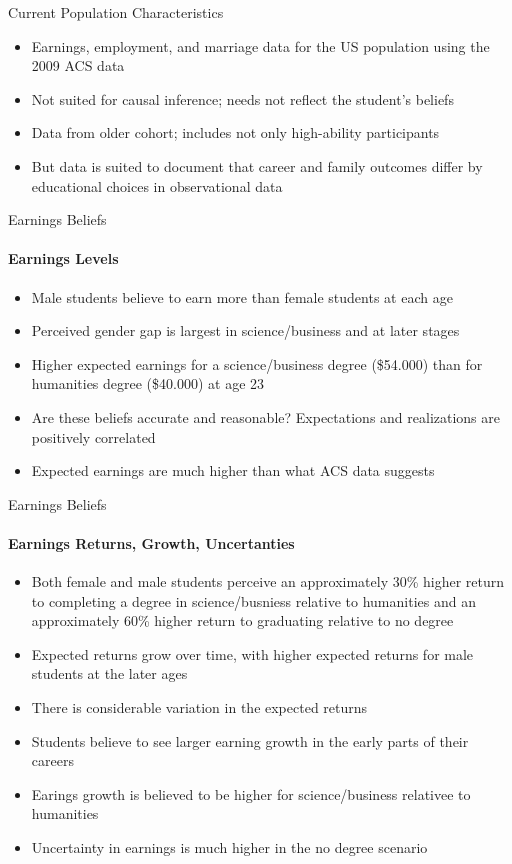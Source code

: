 \documentclass[12pt]{beamer}
\begin{document}
\begin{frame}{Current Population Characteristics}
    \begin{itemize}
        \item Earnings, employment, and marriage data for the US population using the 2009 ACS data
        \item Not suited for causal inference; needs not reflect the student's beliefs
        \item Data from older cohort; includes not only high-ability participants
        \item But data is suited to document that career and family outcomes differ by educational choices in observational data
    \end{itemize}
\end{frame}

\begin{frame}{Earnings Beliefs}
    \framesubtitle{Earnings Levels} 
    \begin{itemize}
        \item Male students believe to earn more than female students at each age
        \item Perceived gender gap is largest in science/business and at later stages
        \item Higher expected earnings for a science/business degree (\$54.000) than for humanities degree (\$40.000) at age 23
        \item Are these beliefs accurate and reasonable? Expectations and realizations are positively correlated
        \item Expected earnings are much higher than what ACS data suggests
    \end{itemize}
\end{frame}

\begin{frame}{Earnings Beliefs}
    \framesubtitle{Earnings Returns, Growth, Uncertanties} 
    \begin{itemize}
        \item Both female and male students perceive an approximately 30\% higher return to completing a degree in science/busniess relative to humanities and an approximately 60\% higher return to graduating relative to no degree
        \item Expected returns grow over time, with higher expected returns for male students at the later ages
        \item There is considerable variation in the expected returns 
        \item Students believe to see larger earning growth in the early parts of their careers
        \item Earings growth is believed to be higher for science/business relativee to humanities
        \item Uncertainty in earnings is much higher in the no degree scenario
    \end{itemize}
\end{frame}
\end{document}
